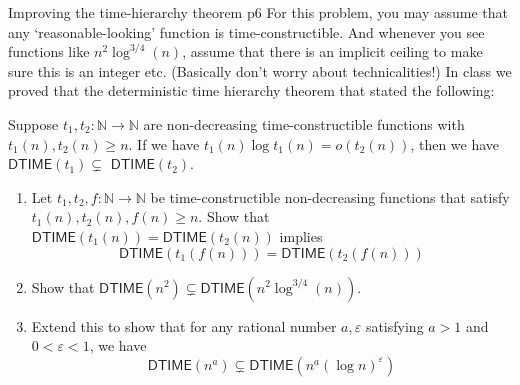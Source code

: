 \documentclass[a4paper, 11pt]{article}
\begin{document}
\begin{problem}{%
		Improving the time-hierarchy theorem
	}{p6%
}
For this problem, you may assume that any `reasonable-looking' function is time-constructible. And whenever you see functions like $n^2 \log ^{3 / 4}(n)$, assume that there is an implicit ceiling to make sure this is an integer etc. (Basically don't worry about technicalities!)
In class we proved that the deterministic time hierarchy theorem that stated the following:

Suppose $t_1, t_2: \mathbb{N} \rightarrow \mathbb{N}$ are non-decreasing time-constructible functions with $t_1(n), t_2(n) \geq n$. If we have $t_1(n) \log t_1(n)=o\left(t_2(n)\right)$, then we have $\textsf{DTIME}\left(t_1\right) \subsetneq$ $\textsf{DTIME}\left(t_2\right)$.
\begin{enumerate}[label=(\alph*)]
\item	Let $t_1, t_2, f: \mathbb{N} \rightarrow \mathbb{N}$ be time-constructible non-decreasing functions that satisfy $t_1(n), t_2(n), f(n) \geq n$. Show that $\textsf{DTIME}\left(t_1(n)\right)=\textsf{DTIME}\left(t_2(n)\right)$ implies
	$$
	\textsf{DTIME}\left(t_1(f(n))\right)=\textsf{DTIME}\left(t_2(f(n))\right)
	$$
	
\noindent{}
\item Show that $\textsf{DTIME}\left(n^2\right) \subsetneq \textsf{DTIME}\left(n^2 \log ^{3 / 4}(n)\right)$.

\noindent{}
\item  Extend this to show that for any rational number $a, \varepsilon$ satisfying $a>1$ and $0<\varepsilon<1$, we have
	$$
	\textsf{DTIME}\left(n^a\right) \subsetneq \textsf{DTIME}\left(n^a(\log n)^{\varepsilon}\right)
	$$
\end{enumerate}
	\end{problem}
\end{document}
